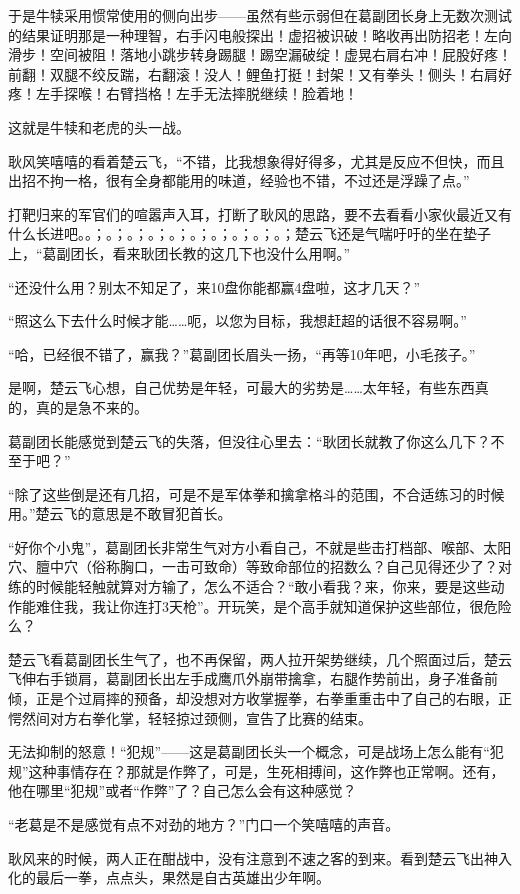 于是牛犊采用惯常使用的侧向出步——虽然有些示弱但在葛副团长身上无数次测试的结果证明那是一种理智，右手闪电般探出！虚招被识破！略收再出防招老！左向滑步！空间被阻！落地小跳步转身踢腿！踢空漏破绽！虚晃右肩右冲！屁股好疼！前翻！双腿不绞反踹，右翻滚！没人！鲤鱼打挺！封架！又有拳头！侧头！右肩好疼！左手探喉！右臂挡格！左手无法摔脱继续！脸着地！

这就是牛犊和老虎的头一战。

耿风笑嘻嘻的看着楚云飞，“不错，比我想象得好得多，尤其是反应不但快，而且出招不拘一格，很有全身都能用的味道，经验也不错，不过还是浮躁了点。”

打靶归来的军官们的喧嚣声入耳，打断了耿风的思路，要不去看看小家伙最近又有什么长进吧。。；。；。；。；。；。；。；。；。；。；楚云飞还是气喘吁吁的坐在垫子上，“葛副团长，看来耿团长教的这几下也没什么用啊。”

“还没什么用？别太不知足了，来10盘你能都赢4盘啦，这才几天？”

“照这么下去什么时候才能……呃，以您为目标，我想赶超的话很不容易啊。”

“哈，已经很不错了，赢我？”葛副团长眉头一扬，“再等10年吧，小毛孩子。”

是啊，楚云飞心想，自己优势是年轻，可最大的劣势是……太年轻，有些东西真的，真的是急不来的。

葛副团长能感觉到楚云飞的失落，但没往心里去：“耿团长就教了你这么几下？不至于吧？”

“除了这些倒是还有几招，可是不是军体拳和擒拿格斗的范围，不合适练习的时候用。”楚云飞的意思是不敢冒犯首长。

“好你个小鬼”，葛副团长非常生气对方小看自己，不就是些击打档部、喉部、太阳穴、膻中穴（俗称胸口，一击可致命）等致命部位的招数么？自己见得还少了？对练的时候能轻触就算对方输了，怎么不适合？“敢小看我？来，你来，要是这些动作能难住我，我让你连打3天枪”。开玩笑，是个高手就知道保护这些部位，很危险么？

楚云飞看葛副团长生气了，也不再保留，两人拉开架势继续，几个照面过后，楚云飞伸右手锁肩，葛副团长出左手成鹰爪外崩带擒拿，右腿作势前出，身子准备前倾，正是个过肩摔的预备，却没想对方收掌握拳，右拳重重击中了自己的右眼，正愕然间对方右拳化掌，轻轻掠过颈侧，宣告了比赛的结束。

无法抑制的怒意！“犯规”——这是葛副团长头一个概念，可是战场上怎么能有“犯规”这种事情存在？那就是作弊了，可是，生死相搏间，这作弊也正常啊。还有，他在哪里“犯规”或者“作弊”了？自己怎么会有这种感觉？

“老葛是不是感觉有点不对劲的地方？”门口一个笑嘻嘻的声音。

耿风来的时候，两人正在酣战中，没有注意到不速之客的到来。看到楚云飞出神入化的最后一拳，点点头，果然是自古英雄出少年啊。

